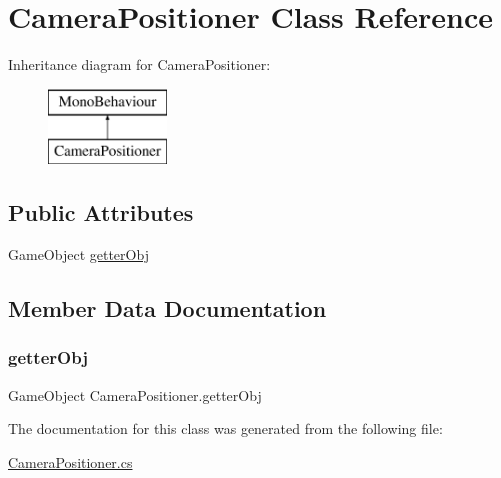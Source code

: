 \hypertarget{class_camera_positioner}{}\section{Camera\+Positioner Class Reference}
\label{class_camera_positioner}
Inheritance diagram for Camera\+Positioner\+:\begin{figure}[H]
\begin{center}
\leavevmode
\includegraphics[height=2.000000cm]{class_camera_positioner}
\end{center}
\end{figure}
\subsection*{Public Attributes}
\begin{DoxyCompactItemize}
\item 
Game\+Object \mbox{\hyperlink{class_camera_positioner_a7ad34060c11c472c397d42cd92ff7d3f}{getter\+Obj}}
\end{DoxyCompactItemize}


\subsection{Member Data Documentation}
\mbox{\label{class_camera_positioner_a7ad34060c11c472c397d42cd92ff7d3f}} 
\subsubsection{\texorpdfstring{getter\+Obj}{getterObj}}
{\footnotesize\ttfamily Game\+Object Camera\+Positioner.\+getter\+Obj}



The documentation for this class was generated from the following file\+:\begin{DoxyCompactItemize}
\item 
\mbox{\hyperlink{_camera_positioner_8cs}{Camera\+Positioner.\+cs}}\end{DoxyCompactItemize}
